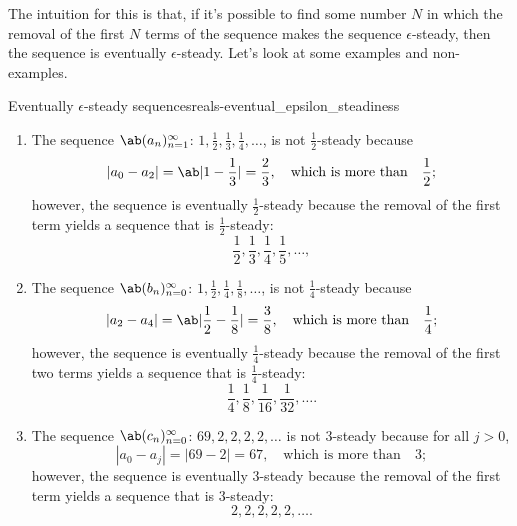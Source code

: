 The intuition for this is that, if it's possible to find some number $N$ in which the
removal of the first $N$ terms of the sequence makes the sequence $\epsilon$-steady,
then the sequence is eventually $\epsilon$-steady. Let's look at some examples and non-examples.
\begin{exmp}{Eventually $\epsilon$-steady sequences}{reals-eventual_epsilon_steadiness}
  \begin{enumerate}
    \item The sequence $\sequence{a_n}{n = 1}{\infty}$:
          $1, \frac{1}{2}, \frac{1}{3}, \frac{1}{4}, \dots$, is not $\frac{1}{2}$-steady because
          \begin{equation*}
            |a_0 - a_2| = \ab|1 - \frac{1}{3}|
                        = \frac{2}{3}, \quad \textrm{which is more than} \quad \frac{1}{2};
          \end{equation*}
          however, the sequence is eventually $\frac{1}{2}$-steady because the removal
          of the first term yields a sequence that is $\frac{1}{2}$-steady:
          \begin{equation*}
            \frac{1}{2}, \frac{1}{3}, \frac{1}{4}, \frac{1}{5}, \dots,
          \end{equation*}
    \item The sequence $\sequence{b_n}{n = 0}{\infty}$:
          $1, \frac{1}{2}, \frac{1}{4}, \frac{1}{8}, \dots$, is not $\frac{1}{4}$-steady because
          \begin{equation*}
            |a_2 - a_4| = \ab|\frac{1}{2} - \frac{1}{8}|
                        = \frac{3}{8}, \quad \textrm{which is more than} \quad \frac{1}{4};
          \end{equation*}
          however, the sequence is eventually $\frac{1}{4}$-steady because the removal
          of the first two terms yields a sequence that is $\frac{1}{4}$-steady:
          \begin{equation*}
            \frac{1}{4}, \frac{1}{8}, \frac{1}{16}, \frac{1}{32}, \dots.
          \end{equation*}
    \item The sequence $\sequence{c_n}{n = 0}{\infty}$: $69, 2, 2, 2, 2, \dots$ is not
          $3$-steady because for all $j > 0$,
          \begin{equation*}
            |a_0 - a_j| = |69 - 2| = 67, \quad \textrm{which is more than} \quad 3;
          \end{equation*}
          however, the sequence is eventually $3$-steady because the removal of the
          first term yields a sequence that is $3$-steady:
          \begin{equation*}
            2, 2, 2, 2, 2, \dots.
          \end{equation*}
  \end{enumerate}
\end{exmp}

